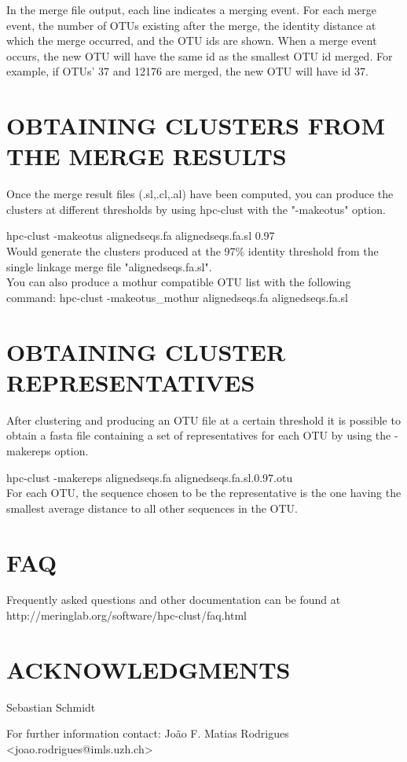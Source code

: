 \documentclass[10pt,a4paper]{article}
\begin{document}
In the merge file output, each line indicates a merging event. For each merge event, the
number of OTUs existing after the merge, the identity distance at which the merge occurred,
and the OTU ids are shown. When a merge event occurs, the new OTU will have the same id 
as the smallest OTU id merged. For example, if OTUs' 37 and 12176 are merged, the new OTU
will have id 37.


\section{OBTAINING CLUSTERS FROM THE MERGE RESULTS}

Once the merge result files (.sl,.cl,.al) have been computed, you can produce the clusters
at different thresholds by using hpc-clust with the "-makeotus" option.

hpc-clust -makeotus alignedseqs.fa alignedseqs.fa.sl 0.97\\

Would generate the clusters produced at the 97\% identity threshold from the single linkage
merge file "alignedseqs.fa.sl".
\\
You can also produce a mothur compatible OTU list with the following command:
hpc-clust -makeotus\_mothur alignedseqs.fa alignedseqs.fa.sl\\

\section{OBTAINING CLUSTER REPRESENTATIVES}

After clustering and producing an OTU file at a certain threshold it is possible to
obtain a fasta file containing a set of representatives for each OTU by using the
-makereps option.

hpc-clust -makereps alignedseqs.fa alignedseqs.fa.sl.0.97.otu\\

For each OTU, the sequence chosen to be the representative is the one having the smallest
average distance to all other sequences in the OTU.


\section{FAQ}
Frequently asked questions and other documentation can be found at
http://meringlab.org/software/hpc-clust/faq.html


\section*{ACKNOWLEDGMENTS}
Sebastian Schmidt




For further information contact: Jo\~ao F. Matias Rodrigues {\textless}joao.rodrigues@imls.uzh.ch\textgreater
\end{document}
